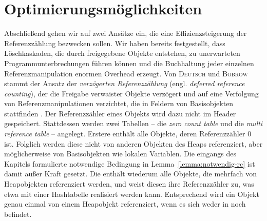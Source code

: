\section{Optimierungsmöglichkeiten}
\label{sec:rc-optimizing}
Abschließend gehen wir auf zwei Ansätze ein, die eine Effizienzsteigerung der Referenzzählung bezwecken sollen.
Wir haben bereits festgestellt, dass Löschkaskaden, die durch freigegebene Objekte entstehen, zu unerwarteten Programmunterbrechungen führen können und die Buchhaltung jeder einzelnen Referenzmanipulation enormen Overhead erzeugt.
Von \textsc{Deutsch} und \textsc{Bobrow} stammt der Ansatz der \textit{verzögerten Referenzzählung} (engl. \textit{deferred reference counting}), der die Freigabe verwaister Objekte verzögert und auf eine Verfolgung von Referenzmanipulationen verzichtet, die in Feldern von Basisobjekten stattfinden \cite{deutsch1976}.
Der Referenzzähler eines Objekts wird dazu nicht im Header gespeichert.
Stattdessen werden zwei Tabellen -- die \textit{zero count table}  und die \textit{multi reference table}  -- angelegt.
Erstere enthält alle Objekte, deren Referenzzähler $0$ ist.
Folglich werden diese nicht von anderen Objekten des Heaps referenziert, aber möglicherweise von Basisobjekten wie lokalen Variablen.
Die eingangs des Kapitels formulierte notwendige Bedingung in Lemma~\ref{lemma:notwendig-rc} ist damit außer Kraft gesetzt.
Die  enthält wiederum alle Objekte, die mehrfach von Heapobjekten referenziert werden, und weist diesen ihre Referenzzähler zu, was etwa mit einer Hashtabelle realisiert werden kann.
Entsprechend wird ein Objekt genau einmal von einem Heapobjekt referenziert, wenn es sich weder in  noch  befindet.

